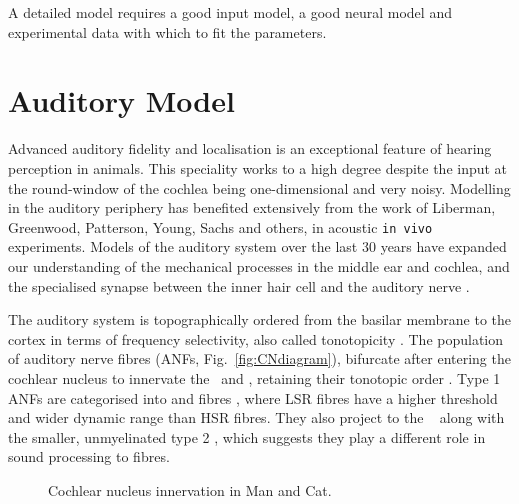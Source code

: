 \smallskip{}

A detailed \BNN model requires a good input model, a good neural model and
experimental data with which to fit the parameters.  

\section{Auditory Model}\label{sec:CN:auditory-model}

Advanced auditory fidelity and localisation is an exceptional feature of hearing
perception in animals.  This speciality works to a high degree despite the input
at the round-window of the cochlea being one-dimensional and very noisy.
Modelling in the auditory periphery has benefited extensively from the work of
Liberman, Greenwood, Patterson, Young, Sachs and others, in acoustic \texttt{in
  vivo} experiments. Models of the auditory system over the last 30 years have
expanded our understanding of the mechanical processes in the middle ear and
cochlea, and the specialised synapse between the inner hair cell and the
auditory nerve \citep{DavisVoigt:1991,Carney:1993,MeddisHewittEtAl:1990}.

\smallskip{}

The auditory system is topographically ordered from the basilar membrane to the
cortex in terms of frequency selectivity, also called tonotopicity
\citep{YoungOertel:2004}.  The population of auditory nerve fibres (ANFs,
Fig.~\ref{fig:CNdiagram}), bifurcate after entering the cochlear nucleus to
innervate the \VCN~and \DCN\@, retaining their tonotopic order
\citep{Lorente:1981, Liberman:1982, Liberman:1993}. Type 1 ANFs are categorised
into {\HSR} and {\LSR} fibres \citep{Liberman:1978}, where LSR fibres have a
higher threshold and wider dynamic range than HSR fibres. They also project to
the \GCD~\citep{RyugoParks:2003, RyugoHaenggeliEtAl:2003} along with the
smaller, unmyelinated type 2 \ANFs, which suggests they play a different role in
sound processing to \HSR fibres.

\smallskip{}

\begin{figure}[tbh]
  \begin{center}
    \caption[Cochlear nucleus innervation in Man and Cat.]{Cochlear nucleus innervation in Man and Cat. \citep[!find out which
      publication printed this!]{RyugoParks:2003,Ryugo:1992,Spoendlin:1973}}
    \label{fig:CN_Cat_Human}
  \end{center}
\end{figure}


